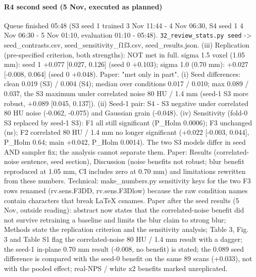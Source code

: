 \paragraph*{R4 second seed (5 Nov, executed as planned)}
Queue finished 05:48 (S3 seed 1 trained 3 Nov 11:44 - 4 Nov 06:30, S4 seed 1 4 Nov 06:30 - 5 Nov 01:10, evaluation 01:10 - 05:48). \texttt{32\_review\_stats.py seed} -\textgreater{} seed\_contrasts.csv, seed\_sensitivity\_f1f3.csv, seed\_results.json. (iii) Replication (pre-specified criterion, both strengths): NOT met in full. sigma 1.5 voxel (1.05 mm): seed 1 +0.077 [0.027, 0.126] (seed 0 +0.103); sigma 1.0 (0.70 mm): +0.027 [-0.008, 0.064] (seed 0 +0.048). Paper: "met only in part". (i) Seed differences: clean 0.019 (S3) / 0.004 (S4); median over conditions 0.017 / 0.010; max 0.089 / 0.037, the S3 maximum under correlated noise 80 HU / 1.4 mm (seed-1 S3 more robust, +0.089 [0.045, 0.137]). (ii) Seed-1 pair: S4 - S3 negative under correlated 80 HU noise (-0.062, -0.075) and Gaussian grain (-0.048). (iv) Sensitivity (fold-0 S3 replaced by seed-1 S3): F1 all still significant (P\_Holm 0.0006); F3 unchanged (ns); F2 correlated 80 HU / 1.4 mm no longer significant (+0.022 [-0.003, 0.044], P\_Holm 0.64; main +0.042, P\_Holm 0.0014). The two S3 models differ in seed AND sampler fix; the analysis cannot separate them. Paper: Results (correlated-noise sentence, seed section), Discussion (noise benefits not robust; blur benefit reproduced at 1.05 mm, CI includes zero at 0.70 mm) and limitations rewritten from these numbers. Technical: make\_numbers.py sensitivity keys for the two F3 rows renamed (rv.sens.F3DD, rv.sens.F3Dlow) because the raw condition names contain characters that break LaTeX csnames. Paper after the seed results (5 Nov, outside reading): abstract now states that the correlated-noise benefit did not survive retraining a baseline and limits the blur claim to strong blur; Methods state the replication criterion and the sensitivity analysis; Table 3, Fig. 3 and Table S1 flag the correlated-noise 80 HU / 1.4 mm result with a dagger; the seed-1 in-plane 0.70 mm result (-0.008, no benefit) is stated; the 0.089 seed difference is compared with the seed-0 benefit on the same 89 scans (+0.033), not with the pooled effect; real-NPS / white x2 benefits marked unreplicated.

